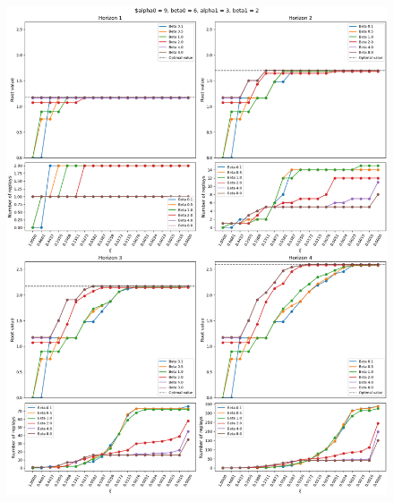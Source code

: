 \documentclass{article}
\begin{document}
\begin{figure}[ht!]
    \centering
    \includegraphics[width=1\textwidth]{../data/convergence/xi/alpha09_beta06_alpha13_beta12_complete.png}
\end{figure}
\end{document}
